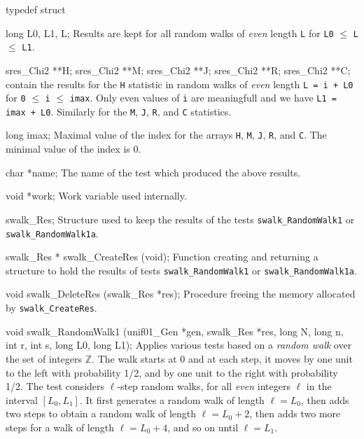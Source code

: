 typedef struct {

   long L0, L1, L;
\endcode
 \tabb Results are kept for all random walks of {\em even} length  {\tt L}
   for {\tt L0} $\le$  {\tt L} $\le$ {\tt L1}.
 \endtabb
\code

   sres_Chi2 **H;
   sres_Chi2 **M;
   sres_Chi2 **J;
   sres_Chi2 **R;
   sres_Chi2 **C;
\endcode
  contain the results for the {\tt H} statistic
  in random walks of {\em even} length {\tt L = i + L0} for
  {\tt 0} $\le$ {\tt i} $\le$ {\tt imax}. Only even values of {\tt i} are
   meaningfull and we have  {\tt L1 = imax + L0}.
   Similarly for the {\tt M}, {\tt J}, {\tt R}, and {\tt C} statistics.
 \endtabb
\code

   long imax;
\endcode
 \tabb Maximal value of the index for the arrays {\tt H}, {\tt M},
 {\tt J}, {\tt R}, and {\tt C}. The minimal value of the index is 0.
 \endtabb
\code

   char *name;
\endcode
 \tabb
  The name of the test which produced the above results.
 \endtabb
\code

   void *work;
\endcode
 \tabb Work variable used internally.
 \endtabb
\code

} swalk_Res;
\endcode
 \tab Structure used to keep the results of 
  the tests {\tt swalk\_RandomWalk1} or  {\tt swalk\_RandomWalk1a}.
 \endtab
\code


swalk_Res * swalk_CreateRes (void);
\endcode
 \tab 
  Function creating and returning a structure to hold the results
  of tests {\tt swalk\_RandomWalk1} or  {\tt swalk\_RandomWalk1a}. 
 \endtab
\code


void swalk_DeleteRes (swalk_Res *res);
\endcode
 \tab 
  Procedure freeing the memory allocated by {\tt swalk\_CreateRes}.
 \endtab


\fi %



\code

void swalk_RandomWalk1 (unif01_Gen *gen, swalk_Res *res, long N, long n,
                        int r, int s, long L0, long L1);
\endcode
 \tab
   Applies various tests 
   based on a {\em random walk\/} over the 
   set of integers $\mathbb{Z}$.  The walk starts at 0 and at each step,
   it moves by one unit to the left with probability 1/2,
   and by one unit to the right with probability 1/2.
   The test considers $\ell$-step random walks, for all {\em even\/}
   integers $\ell$ in the interval $[L_0, L_1]$.
   It first generates a random walk of length $\ell = L_0$, then adds
   two steps to obtain a random walk of length $\ell = L_0+2$,
   then adds two more steps for a walk of length $\ell = L_0+4$,
   and so on until $\ell = L_1$.

